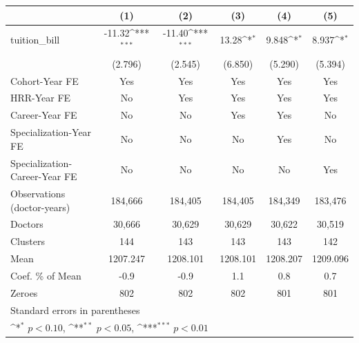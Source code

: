 {
\def\sym#1{\ifmmode^{#1}\else\(^{#1}\)\fi}
\begin{tabular}{l*{5}{c}}
\hline\hline
                    &\multicolumn{1}{c}{(1)}         &\multicolumn{1}{c}{(2)}         &\multicolumn{1}{c}{(3)}         &\multicolumn{1}{c}{(4)}         &\multicolumn{1}{c}{(5)}         \\
\hline
tuition\_bill        &      -11.32\sym{***}&      -11.40\sym{***}&       13.28\sym{*}  &       9.848\sym{*}  &       8.937\sym{*}  \\
                    &     (2.796)         &     (2.545)         &     (6.850)         &     (5.290)         &     (5.394)         \\
[1em]
Cohort-Year FE      &         Yes         &         Yes         &         Yes         &         Yes         &         Yes         \\
[1em]
HRR-Year FE         &          No         &         Yes         &         Yes         &         Yes         &         Yes         \\
[1em]
Career-Year FE      &          No         &          No         &         Yes         &         Yes         &          No         \\
[1em]
Specialization-Year FE&          No         &          No         &          No         &         Yes         &          No         \\
[1em]
Specialization-Career-Year FE&          No         &          No         &          No         &          No         &         Yes         \\
\hline
Observations (doctor-years)&     184,666         &     184,405         &     184,405         &     184,349         &     183,476         \\
Doctors             &      30,666         &      30,629         &      30,629         &      30,622         &      30,519         \\
Clusters            &         144         &         143         &         143         &         143         &         142         \\
Mean                &    1207.247         &    1208.101         &    1208.101         &    1208.207         &    1209.096         \\
Coef. \% of Mean    &        -0.9         &        -0.9         &         1.1         &         0.8         &         0.7         \\
Zeroes              &         802         &         802         &         802         &         801         &         801         \\
\hline\hline
\multicolumn{6}{l}{\footnotesize Standard errors in parentheses}\\
\multicolumn{6}{l}{\footnotesize \sym{*} \(p<0.10\), \sym{**} \(p<0.05\), \sym{***} \(p<0.01\)}\\
\end{tabular}
}
